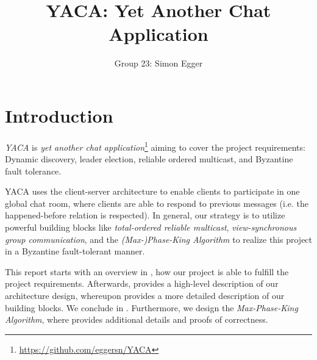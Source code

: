 \documentclass[runningheads]{llncs}
\begin{document}
%
\title{YACA: Yet Another Chat Application}

\author{Group 23: Simon Egger}

\institute{}
%
\maketitle              %

\section{Introduction}
\textit{YACA} is \textit{yet another chat application}\footnote{\url{https://github.com/eggersn/YACA}} aiming to cover the project requirements: Dynamic discovery, leader election, reliable ordered multicast, and Byzantine fault tolerance. \cite{Egger2021}

YACA uses the client-server architecture to enable clients to participate in one global chat room, where clients are able to respond to previous messages (i.e. the happened-before relation is respected). In general, our strategy is to utilize powerful building blocks like \textit{total-ordered reliable multicast}, \textit{view-synchronous group communication}, and the \textit{(Max-)Phase-King Algorithm} to realize this project in a Byzantine fault-tolerant manner.

This report starts with an overview in , how our project is able to fulfill the project requirements. Afterwards,  provides a high-level description of our architecture design, whereupon  provides a more detailed description of our building blocks. We conclude in . Furthermore, we design the \textit{Max-Phase-King Algorithm}, where  provides additional details and proofs of correctness. 
\end{document}
